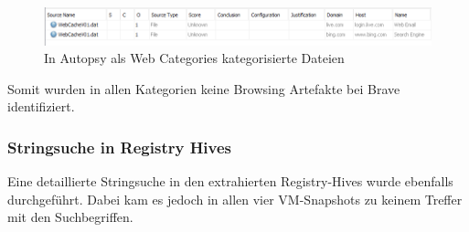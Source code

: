 \begin{appendices}
\begin{figure}[h!]
	\centering
	\includegraphics[width=\textwidth]{bilder/BRCat.png}
	\caption{In Autopsy als \glqq{}Web Categories\grqq{} kategorisierte Dateien}
	\label{img:brave-web-categories}  
\end{figure}

Somit wurden in allen Kategorien keine Browsing Artefakte bei Brave identifiziert.

\subsubsection*{Stringsuche in Registry Hives}

Eine detaillierte Stringsuche in den extrahierten Registry-Hives wurde ebenfalls durchgeführt. Dabei kam es jedoch in allen vier VM-Snapshots zu keinem Treffer mit den Suchbegriffen.

\end{appendices}